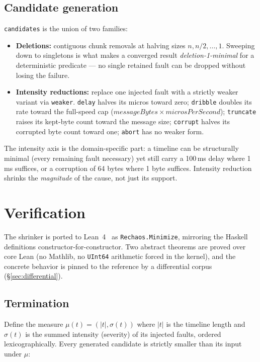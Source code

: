 \documentclass[10pt,twocolumn,letterpaper]{article}
\newcommand{\tool}[1]{\texttt{#1}}
\begin{document}
\subsection{Candidate generation}
\texttt{candidates} is the union of two families:
\begin{itemize}[leftmargin=1.2em,itemsep=1pt,topsep=2pt]
\item \textbf{Deletions:} contiguous chunk removals at halving sizes
$n, n/2, \dots, 1$. Sweeping down to singletons is what makes a converged result
\emph{deletion-1-minimal} for a deterministic predicate --- no single retained
fault can be dropped without losing the failure.
\item \textbf{Intensity reductions:} replace one injected fault with a strictly
weaker variant via \texttt{weaker}. \tool{delay} halves its micros toward zero;
\tool{dribble} doubles its rate toward the full-speed cap
($\mathit{messageBytes} \times \mathit{microsPerSecond}$); \tool{truncate} raises
its kept-byte count toward the message size; \tool{corrupt} halves its corrupted
byte count toward one; \tool{abort} has no weaker form.
\end{itemize}
The intensity axis is the domain-specific part: a timeline can be structurally
minimal (every remaining fault necessary) yet still carry a 100\,ms delay where
1\,ms suffices, or a corruption of 64 bytes where 1 byte suffices. Intensity
reduction shrinks the \emph{magnitude} of the cause, not just its support.

\section{Verification}\label{sec:proofs}
The shrinker is ported to Lean~4~\cite{leanprover} as
\texttt{Rechaos.Minimize}, mirroring the Haskell definitions
constructor-for-constructor. Two abstract theorems are proved over core Lean (no
Mathlib, no \texttt{UInt64} arithmetic forced in the kernel), and the concrete
behavior is pinned to the reference by a differential corpus (\S\ref{sec:differential}).

\subsection{Termination}
Define the measure $\mu(t) = (|t|, \sigma(t))$ where $|t|$ is the timeline length
and $\sigma(t)$ is the summed intensity (severity) of its injected faults,
ordered lexicographically. Every generated candidate is strictly smaller than its
input under $\mu$:
\end{document}
